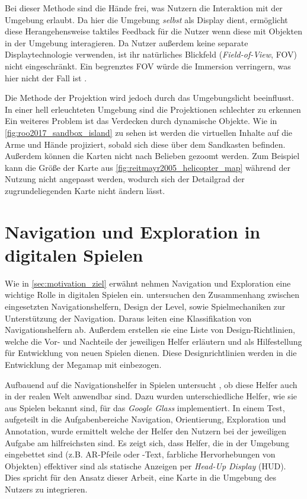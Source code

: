 Bei dieser Methode sind die Hände frei, was Nutzern die Interaktion mit der Umgebung erlaubt.
Da hier die Umgebung \emph{selbst} als Display dient, ermöglicht diese Herangehensweise taktiles Feedback für die Nutzer wenn diese mit Objekten in der Umgebung interagieren.
Da Nutzer außerdem keine separate Displaytechnologie verwenden, ist ihr natürliches Blickfeld (\emph{Field-of-View}, FOV) nicht eingeschränkt.
Ein begrenztes FOV würde die Immersion verringern, was hier nicht der Fall ist \parencite[3\pageff]{Krevelen2010}. %

Die Methode der Projektion wird jedoch durch das Umgebungslicht beeinflusst.
In einer hell erleuchteten Umgebung sind die Projektionen schlechter zu erkennen \parencite{???} %
Ein weiteres Problem ist das Verdecken durch dynamische Objekte.
Wie in \autoref{fig:roo2017_sandbox_island} zu sehen ist werden die virtuellen Inhalte auf die Arme und Hände projiziert, sobald sich diese über dem Sandkasten befinden.
Außerdem können die Karten nicht nach Belieben gezoomt werden.
Zum Beispiel kann die Größe der Karte aus \autoref{fig:reitmayr2005_helicopter_map} während der Nutzung nicht angepasst werden, wodurch sich der Detailgrad der zugrundeliegenden Karte nicht ändern lässt.

\section{Navigation und Exploration in digitalen Spielen}
Wie in \autoref{sec:motivation_ziel} erwähnt nehmen Navigation und Exploration eine wichtige Rolle in digitalen Spielen ein.
\textcites{Moura2014}{Moura2015} untersuchen den Zusammenhang zwischen eingesetzten Navigationshelfern, Design der Level, sowie Spielmechaniken zur Unterstützung der Navigation.
Daraus leiten \textcite{Moura2015} eine Klassifikation von Navigationshelfern ab.
Außerdem erstellen sie eine Liste von Design-Richtlinien, welche die Vor- und Nachteile der jeweiligen Helfer erläutern und als Hilfestellung für Entwicklung von neuen Spielen dienen.
Diese Designrichtlinien werden in die Entwicklung der Megamap mit einbezogen.

Aufbauend auf die Navigationshelfer in Spielen untersucht \textcite{Lodts2015}, ob diese Helfer auch in der realen Welt anwendbar sind.
Dazu wurden unterschiedliche Helfer, wie sie aus Spielen bekannt sind, für das \emph{Google Glass} implementiert.
In einem Test, aufgeteilt in die Aufgabenbereiche Navigation, Orientierung, Exploration und Annotation, wurde ermittelt welche der Helfer den Nutzern bei der jeweiligen Aufgabe am hilfreichsten sind.
Es zeigt sich, dass Helfer, die in der Umgebung eingebettet sind (z.B. AR-Pfeile oder -Text, farbliche Hervorhebungen von Objekten) effektiver sind als statische Anzeigen per \emph{Head-Up Display} (HUD).
Dies spricht für den Ansatz dieser Arbeit, eine Karte in die Umgebung des Nutzers zu integrieren.

